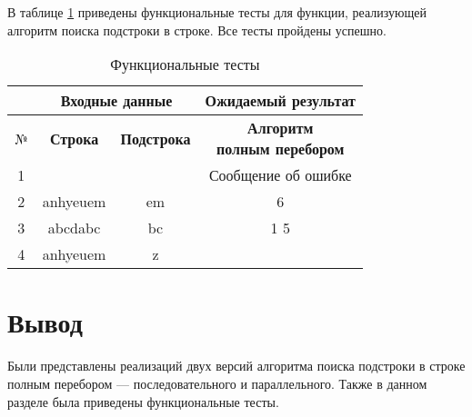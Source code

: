В таблице \ref{tbl:tests} приведены функциональные тесты для функции, реализующей алгоритм поиска подстроки в строке. Все тесты пройдены успешно.

\begin{table}[h]
	\begin{center}
		\begin{threeparttable}
			\captionsetup{justification=raggedright,singlelinecheck=off}
			\caption{\label{tbl:tests} Функциональные тесты}
			\begin{tabular}{|c|c|c|c|}
				\hline
				& \multicolumn{2}{c|}{\bfseries Входные данные}& \bfseries Ожидаемый результат \\
				\hline
				№&\bfseries Строка& \bfseries Подстрока& \makecell{\bfseries Алгоритм\\ \bfseries полным перебором} \\
				\hline
				1&&&Сообщение об ошибке\\
				\hline
				2&anhyeuem&em&6\\
				\hline
				3&abcdabc&bc& 1 5 \\
				\hline
				4&anhyeuem&z&\\
				\hline
			\end{tabular}
		\end{threeparttable}
	\end{center}
\end{table}

\section*{Вывод}

Были представлены реализаций двух версий алгоритма поиска подстроки в строке полным перебором --- последовательного и параллельного. Также в данном разделе была приведены функциональные тесты.

